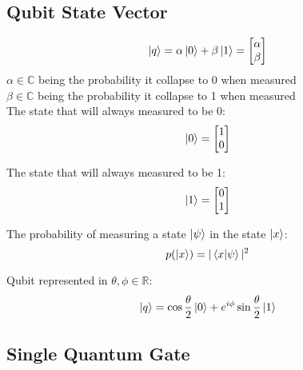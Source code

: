 \documentclass{article}
\begin{document}
\subsection*{Qubit State Vector}
$$\Ket{q} = \alpha\Ket{0} + \beta\Ket{1} =
\begin{bmatrix}
    \alpha\\
    \beta
\end{bmatrix}
$$
$ \alpha \in \mathbb{C}$ being the probability it collapse to 0 when measured\\
$ \beta  \in \mathbb{C}$ being the probability it collapse to 1 when measured\\

The state that will always measured to be 0:
$$
\Ket{0} = 
\begin{bmatrix}
    1\\
    0
\end{bmatrix}
$$

The state that will always measured to be 1:
$$
\Ket{1} = 
\begin{bmatrix}
    0\\
    1
\end{bmatrix}
$$

The probability of measuring a state $\Ket{\psi}$ in the state $\Ket{x}$:
$$p(\Ket{x})=|\braket{x|\psi}|^2$$

Qubit represented in $\theta,\phi\in\mathbb{R}$:
$$\Ket{q}=\cos\frac{\theta}{2}\Ket{0}+e^{i\phi}\sin\frac{\theta}{2}\Ket{1}$$

\newpage
\subsection*{Single Quantum Gate}
\end{document}
